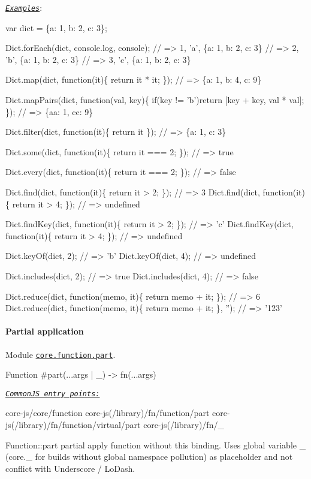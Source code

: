 \href{http://goo.gl/xFi1RH}{\tt {\itshape Examples}}\+: 
\begin{DoxyCode}
var dict = \{a: 1, b: 2, c: 3\};

Dict.forEach(dict, console.log, console);
// => 1, 'a', \{a: 1, b: 2, c: 3\}
// => 2, 'b', \{a: 1, b: 2, c: 3\}
// => 3, 'c', \{a: 1, b: 2, c: 3\}

Dict.map(dict, function(it)\{
  return it * it;
\}); // => \{a: 1, b: 4, c: 9\}

Dict.mapPairs(dict, function(val, key)\{
  if(key != 'b')return [key + key, val * val];
\}); // => \{aa: 1, cc: 9\}

Dict.filter(dict, function(it)\{
  return it %
\}); // => \{a: 1, c: 3\}

Dict.some(dict, function(it)\{
  return it === 2;
\}); // => true

Dict.every(dict, function(it)\{
  return it === 2;
\}); // => false

Dict.find(dict, function(it)\{
  return it > 2;
\}); // => 3
Dict.find(dict, function(it)\{
  return it > 4;
\}); // => undefined

Dict.findKey(dict, function(it)\{
  return it > 2;
\}); // => 'c'
Dict.findKey(dict, function(it)\{
  return it > 4;
\}); // => undefined

Dict.keyOf(dict, 2);    // => 'b'
Dict.keyOf(dict, 4);    // => undefined

Dict.includes(dict, 2); // => true
Dict.includes(dict, 4); // => false

Dict.reduce(dict, function(memo, it)\{
  return memo + it;
\});     // => 6
Dict.reduce(dict, function(memo, it)\{
  return memo + it;
\}, ''); // => '123'
\end{DoxyCode}
 \paragraph*{Partial application}

Module \href{https://github.com/zloirock/core-js/blob/v2.6.0/modules/core.function.part.js}{\tt {\ttfamily core.\+function.\+part}}. 
\begin{DoxyCode}
Function
  #part(...args | \_) -> fn(...args)
\end{DoxyCode}


\href{#commonjs}{\tt {\itshape Common\+JS entry points\+:}} 
\begin{DoxyCode}
core-js/core/function
core-js(/library)/fn/function/part
core-js(/library)/fn/function/virtual/part
core-js(/library)/fn/\_
\end{DoxyCode}
 {\ttfamily Function\+::part} partial apply function without {\ttfamily this} binding. Uses global variable {\ttfamily \+\_\+} ({\ttfamily core.\+\_\+} for builds without global namespace pollution) as placeholder and not conflict with {\ttfamily Underscore} / {\ttfamily Lo\+Dash}.

